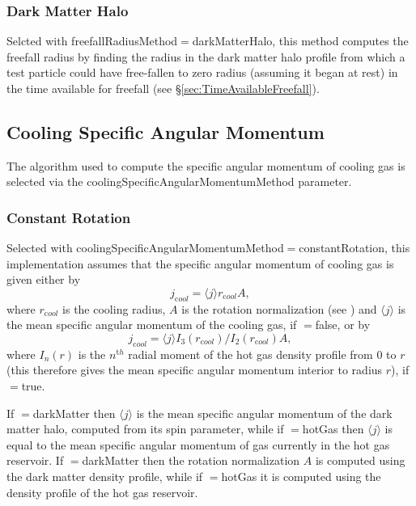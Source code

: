 \subsubsection{Dark Matter Halo}

Selcted with {\normalfont \ttfamily freefallRadiusMethod}$=${\normalfont \ttfamily darkMatterHalo}, this method computes the freefall radius by finding the radius in the dark matter halo profile from which a test particle could have free-fallen to zero radius (assuming it began at rest) in the time available for freefall (see \S\ref{sec:TimeAvailableFreefall}).

\subsection{Cooling Specific Angular Momentum}

The algorithm used to compute the specific angular momentum of cooling gas is selected via the {\normalfont \ttfamily coolingSpecificAngularMomentumMethod} parameter.

\subsubsection{Constant Rotation}

Selected with {\normalfont \ttfamily coolingSpecificAngularMomentumMethod}$=${\normalfont \ttfamily constantRotation}, this implementation assumes that the specific angular momentum of cooling gas is given either by
\begin{equation}
 j_{\mathrm cool} = \langle j \rangle r_{\mathrm cool} A,
\end{equation}
where $r_{\mathrm cool}$ is the cooling radius, $A$ is the rotation normalization (see ) and $\langle j \rangle$ is the mean specific angular momentum of the cooling gas, if {\normalfont \ttfamily [coolingAngularMomentumUseInteriorMean]}$=${\normalfont \ttfamily false}, or by
\begin{equation}
 j_{\mathrm cool} = \langle j \rangle {I_3(r_{\mathrm cool})/I_2(r_{\mathrm cool})} A,
\end{equation}
where $I_n(r)$ is the $n^{\mathrm th}$ radial moment of the hot gas density profile from $0$ to $r$ (this therefore gives the mean specific angular momentum interior to radius $r$), if {\normalfont \ttfamily [coolingAngularMomentumUseInteriorMean]}$=${\normalfont \ttfamily true}.

If {\normalfont \ttfamily [coolingMeanAngularMomentumFrom]}$=${\normalfont \ttfamily darkMatter} then $\langle j \rangle$ is the mean specific angular momentum of the dark matter halo, computed from its spin parameter, while if {\normalfont \ttfamily [coolingMeanAngularMomentumFrom]}$=${\normalfont \ttfamily hotGas} then $\langle j \rangle$ is equal to the mean specific angular momentum of gas currently in the hot gas reservoir. If {\normalfont \ttfamily [coolingRotationVelocityFrom]}$=${\normalfont \ttfamily darkMatter} then the rotation normalization $A$ is computed using the dark matter density profile, while if {\normalfont \ttfamily [coolingRotationVelocityFrom]}$=${\normalfont \ttfamily hotGas} it is computed using the density profile of the hot gas reservoir.

